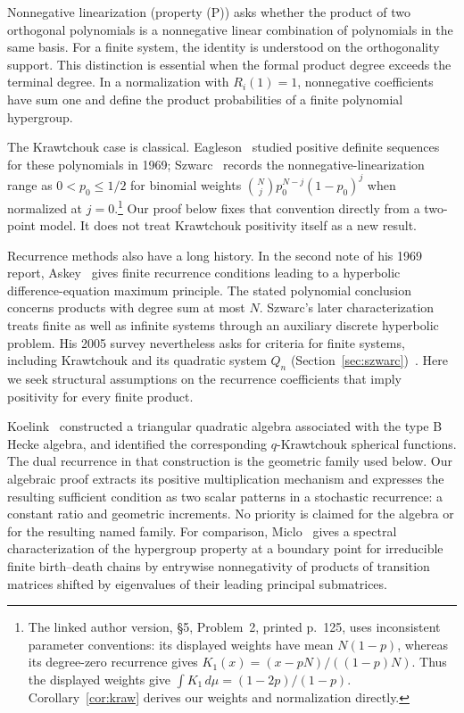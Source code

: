 \documentclass[twoside,10pt]{article}
\makeatletter
\numberwithin{equation}{section}
\theoremstyle{slbody}
\theoremstyle{definition}
\theoremstyle{remark}
\renewcommand{\section}{\@startsection{section}{1}{\z@}{-3.5ex \@plus -1ex \@minus -.2ex}{2.3ex \@plus .2ex}{\normalfont\large\bfseries}}
\makeatother
\begin{document}
\vskip50pt
\baselineskip=13.5pt
\section{Introduction}\label{sec:introduction}

Nonnegative linearization (property (P)) asks whether the product of two orthogonal polynomials is a nonnegative linear combination of polynomials in the same basis. For a finite system, the identity is understood on the orthogonality support. This distinction is essential when the formal product degree exceeds the terminal degree. In a normalization with $R_i(1)=1$, nonnegative coefficients have sum one and define the product probabilities of a finite polynomial hypergroup.

The Krawtchouk case is classical. Eagleson~\cite{eagleson} studied positive definite sequences for these polynomials in 1969; Szwarc~\cite[\S5, Problem~2]{szwarc} records the nonnegative-linearization range as $0<p_0\leq1/2$ for binomial weights $\binom Njp_0^{N-j}(1-p_0)^j$ when normalized at $j=0$.\footnote{The linked author version, \S5, Problem~2, printed p.~125, uses inconsistent parameter conventions: its displayed weights have mean $N(1-p)$, whereas its degree-zero recurrence gives $K_1(x)=(x-pN)/((1-p)N)$. Thus the displayed weights give $\int K_1\,d\mu=(1-2p)/(1-p)$. Corollary~\ref{cor:kraw} derives our weights and normalization directly.} Our proof below fixes that convention directly from a two-point model. It does not treat Krawtchouk positivity itself as a new result.

Recurrence methods also have a long history. In the second note of his 1969 report, Askey~\cite[Part~II, Theorem~1 and Corollary~1]{askey} gives finite recurrence conditions leading to a hyperbolic difference-equation maximum principle. The stated polynomial conclusion concerns products with degree sum at most $N$. Szwarc's later characterization~\cite[Theorem~1]{szwarc2003} treats finite as well as infinite systems through an auxiliary discrete hyperbolic problem. His 2005 survey nevertheless asks for criteria for finite systems, including Krawtchouk and its quadratic system $Q_n$ (Section~\ref{sec:szwarc})~\cite[\S5, Problem~2]{szwarc}. Here we seek structural assumptions on the recurrence coefficients that imply positivity for every finite product.

Koelink~\cite[Theorems~3.1(ii) and 7.8]{koelink} constructed a triangular quadratic algebra associated with the type B Hecke algebra, and identified the corresponding $q$-Krawtchouk spherical functions. The dual recurrence in that construction is the geometric family used below. Our algebraic proof extracts its positive multiplication mechanism and expresses the resulting sufficient condition as two scalar patterns in a stochastic recurrence: a constant ratio and geometric increments. No priority is claimed for the algebra or for the resulting named family. For comparison, Miclo~\cite[Proposition~3.3]{miclo} gives a spectral characterization of the hypergroup property at a boundary point for irreducible finite birth--death chains by entrywise nonnegativity of products of transition matrices shifted by eigenvalues of their leading principal submatrices.
\end{document}
